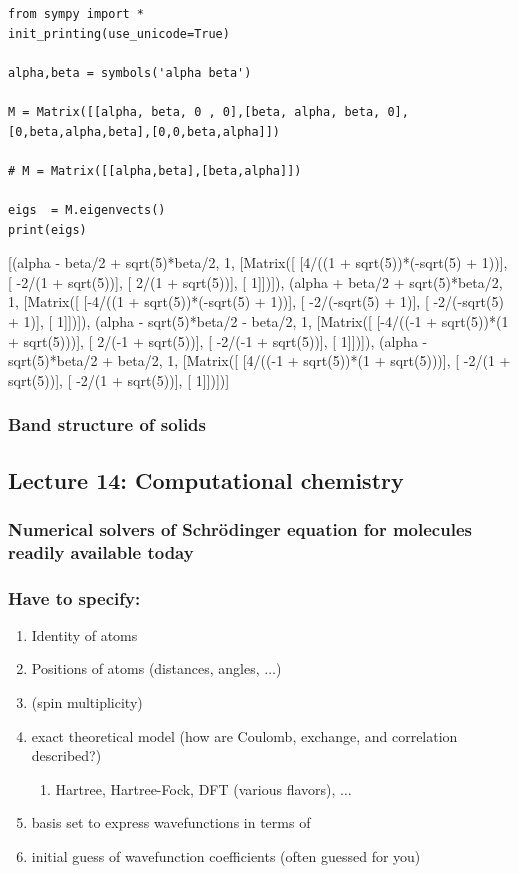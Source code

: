 \documentclass[11pt]{article}
\begin{document}
\begin{verbatim}
from sympy import *
init_printing(use_unicode=True)

alpha,beta = symbols('alpha beta')

M = Matrix([[alpha, beta, 0 , 0],[beta, alpha, beta, 0],[0,beta,alpha,beta],[0,0,beta,alpha]])

# M = Matrix([[alpha,beta],[beta,alpha]])

eigs  = M.eigenvects()
print(eigs)
\end{verbatim}

[(alpha - beta/2 + sqrt(5)*beta/2, 1, [Matrix([
[4/((1 + sqrt(5))*(-sqrt(5) + 1))],
[                -2/(1 + sqrt(5))],
[                 2/(1 + sqrt(5))],
[                               1]])]), (alpha + beta/2 + sqrt(5)*beta/2, 1, [Matrix([
[-4/((1 + sqrt(5))*(-sqrt(5) + 1))],
[                -2/(-sqrt(5) + 1)],
[                -2/(-sqrt(5) + 1)],
[                                1]])]), (alpha - sqrt(5)*beta/2 - beta/2, 1, [Matrix([
[-4/((-1 + sqrt(5))*(1 + sqrt(5)))],
[                 2/(-1 + sqrt(5))],
[                -2/(-1 + sqrt(5))],
[                                1]])]), (alpha - sqrt(5)*beta/2 + beta/2, 1, [Matrix([
[4/((-1 + sqrt(5))*(1 + sqrt(5)))],
[                -2/(1 + sqrt(5))],
[                -2/(1 + sqrt(5))],
[                               1]])])]

\subsubsection{Band structure of solids}
\label{sec:org7356f3e}

\subsection{Lecture 14: Computational chemistry}
\label{sec:org2f3be14}
\subsubsection{Numerical solvers of Schr\"{o}dinger equation for molecules readily available today}
\label{sec:orgcb58c09}
\subsubsection{Have to specify:}
\label{sec:org6a54728}
\begin{enumerate}
\item Identity of atoms
\item Positions of atoms (distances, angles, \(\ldots\))
\item (spin multiplicity)
\item exact theoretical model (how are Coulomb, exchange, and correlation described?)
\begin{enumerate}
\item Hartree, Hartree-Fock, DFT (various flavors), \(\ldots\)
\end{enumerate}

\item basis set to express wavefunctions in terms of
\item initial guess of wavefunction coefficients (often guessed for you)
\end{enumerate}
\end{document}
